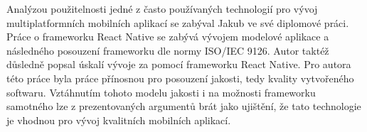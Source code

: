 Analýzou použitelnosti jedné z často používaných technologií pro vývoj multiplatformních mobilních aplikací se zabýval Jakub \textcite{Menda2018thesis} ve své diplomové práci. Práce o frameworku React Native se zabývá vývojem modelové aplikace a následného posouzení frameworku dle normy ISO/IEC 9126. Autor taktéž důsledně popsal úskalí vývoje za pomocí frameworku React Native. Pro autora této práce byla práce přínosnou pro posouzení jakosti, tedy kvality vytvořeného softwaru. Vztáhnutím tohoto modelu jakosti i na možnosti frameworku samotného lze z prezentovaných argumentů brát jako ujištění, že tato technologie je vhodnou pro vývoj kvalitních mobilních aplikací.

